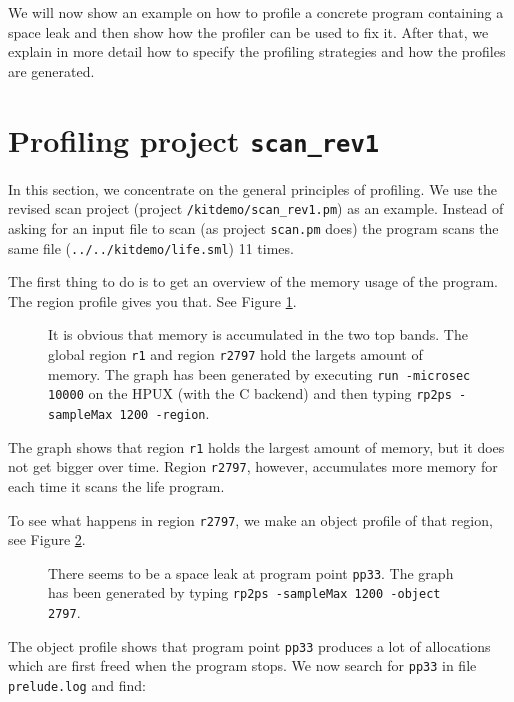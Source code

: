\documentclass[12pt]{book}
\begin{document}
We will now show an example on how to profile a concrete program
containing a space leak and then show how the profiler can be used to
fix it. After that, we explain in more detail how to specify the profiling
strategies and how the profiles are generated.

\section{Profiling project \texttt{scan\_rev1}}

In this section, we concentrate on the general principles of profiling. We
use the revised scan project (project \texttt{/kitdemo/scan\_rev1.pm}) as
an example. Instead of asking for an input file to scan (as project
\texttt{scan.pm} does) the program scans the same file
(\texttt{../../kitdemo/life.sml}) 11 times.

The first thing to do is to get an overview of the memory usage of the
program. The region profile gives you that. See Figure
\ref{scan_rev1_1.fig}.

\begin{figure}[htb]
\begin{center}
  \caption{It is obvious that memory is accumulated in the two top
    bands. The global region \texttt{r1} and region \texttt{r2797}
    hold the largets amount of memory. The graph has been generated
    by executing \texttt{run -microsec 10000} on the HPUX (with the C
    backend) and then typing \texttt{rp2ps -sampleMax 1200
      -region}.}\label{scan_rev1_1.fig}
\end{center}
\end{figure}
The graph shows that region \texttt{r1} holds the largest amount of memory,
but it does not get bigger over time. Region \texttt{r2797}, however,
accumulates more memory for each time it scans the life
program.

To see what happens in region \texttt{r2797}, we make an object profile of
that region, see Figure \ref{scan_rev1_2.fig}.

\begin{figure}[htb]
\begin{center}
  \caption{There seems to be a space leak at program point
    \texttt{pp33}. The graph has been generated by typing \texttt{rp2ps
      -sampleMax 1200 -object 2797}.}\label{scan_rev1_2.fig}
\end{center}
\end{figure}
The object profile shows that program point \texttt{pp33} produces a lot
of allocations which are first freed when the program stops. We now
search for \texttt{pp33} in file \texttt{prelude.log} and find:
\end{document}
